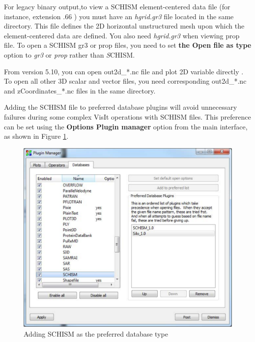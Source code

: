 \documentclass[12pt]{report}
\begin{document}
For legacy binary output,to view a SCHISM element-centered data file (for instance, extension .66 ) you must have 
an \emph{hgrid.gr3} file located in the same directory.  This file defines the 2D horizontal 
unstructured mesh upon which the element-centered data are defined. You also need \emph{hgrid.gr3} when viewing prop file.
To open a SCHISM gr3 or prop files, you need to set {\bf the Open file as type} option to \emph{gr3} or \emph{prop} rather than {\emph SCHISM}.

From version 5.10, you can open out2d\_*.nc file and plot 2D variable directly . To open all other 3D scalar and vector files, you need corresponding out2d\_*.nc and zCoordinates\_*.nc files in the same directory.

Adding the SCHISM file to preferred database plugins will avoid unnecessary failures during some complex VisIt operations with SCHISM files. This preference can be set using the {\bf Options \textrightarrow Plugin manager} 
option from the main interface, as shown in Figure \ref{figure:preferDatabase}.
	
        \begin{figure}
				\begin{center}
        \includegraphics{preferDatabase}
        \caption{Adding SCHISM as the preferred database type}
        \label{figure:preferDatabase}
        \end{center}
        \end{figure}
				
\end{document}
